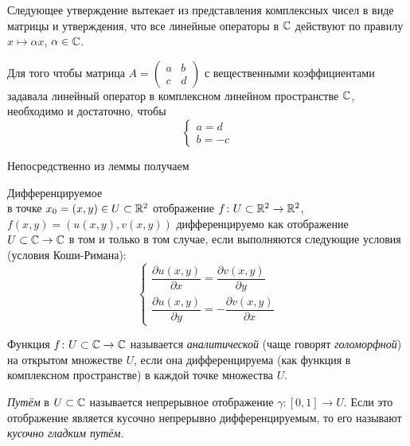 Следующее утверждение вытекает из представления комплексных чисел в виде матрицы и утверждения,
что все линейные операторы в $\mathbb{C}$ действуют по правилу $x \mapsto \alpha x$, 
$\alpha \in \mathbb{C}$.

\begin{lemma}
    Для того чтобы матрица $A = \begin{pmatrix}
    a & b \\
    c & d 
    \end{pmatrix}$ с вещественными коэффициентами задавала
    линейный оператор в комплексном линейном пространстве $\mathbb{C}$, необходимо и достаточно, чтобы
    \[ \left\{\begin{array}{l}
        a = d \\
        b = -c
        \end{array}\right.\]
\end{lemma}

Непосредственно из леммы получаем
\begin{theorem}
    Дифференцируемое \\ в точке $x_0 = (x, y) \in U \subset \mathbb{R}^2$ 
    отображение $f \colon U \subset \mathbb{R}^2 \to \mathbb{R}^2$,
    $f(x, y) = (u(x, y), v(x, y))$
    дифференцируемо как отображение $U \subset \mathbb{C} \to \mathbb{C}$ в том и только в том случае, если выполняются следующие условия (условия Коши-Римана):
    \[ \left\{\begin{array}{l}
        \dfrac{\partial u(x, y)}{\partial x} 
            = \dfrac{\partial v(x, y)}{\partial y} \\
        \dfrac{\partial u(x, y)}{\partial y}
            = -\dfrac{\partial v(x, y)}{\partial x}
        \end{array}\right. \]
\end{theorem}

\begin{definition}
    Функция $f \colon U \subset \mathbb{C} \to \mathbb{C}$ называется \emph{аналитической} 
    (чаще говорят \emph{голоморфной}) на открытом множестве $U$, если она дифференцируема 
    (как функция в комплексном пространстве) 
    в каждой точке множества $U$. 
\end{definition}

\begin{definition}
    \emph{Путём} в $U \subset \mathbb{C}$ называется непрерывное отображение
    $\gamma \colon [0, 1] \to U$. Если это отображение является кусочно непрерывно
    дифференцируемым, то его называют \emph{кусочно гладким путём}.
\end{definition}

